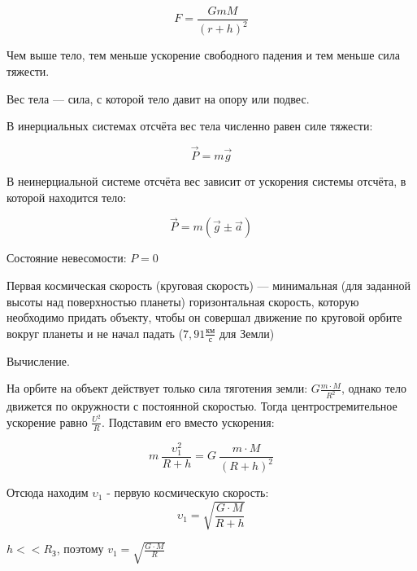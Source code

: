 $$F=\frac{GmM}{(r+h)^2}$$

Чем выше тело, тем меньше ускорение свободного падения и тем меньше сила тяжести.

\begin{definition}
    Вес тела — сила, с которой тело давит на опору или подвес.

    В инерциальных системах отсчёта вес тела численно равен силе тяжести:

    $$\vec P=m\vec g$$

    В неинерциальной системе отсчёта вес зависит от ускорения системы отсчёта, в которой находится тело:

    $$
    \vec P=m(\vec g\pm\vec a)
    $$

    Состояние невесомости: $P=0$
\end{definition}

\begin{definition}
    Первая космическая скорость (круговая скорость) — минимальная (для заданной высоты над поверхностью планеты) горизонтальная скорость, 
    которую необходимо придать объекту, чтобы он совершал движение по круговой орбите вокруг планеты и не начал падать ($7,91\frac{км}{с}$ для Земли)
\end{definition}

\begin{remark}
    Вычисление.

    На орбите на объект действует только сила тяготения земли: $G \frac{m\cdot M}{R^2}$, 
    однако тело движется по окружности с постоянной скоростью. Тогда центростремительное ускорение равно $\frac{U^2}{R}$. 
    Подставим его вместо ускорения:

    $$m\ \frac{\upsilon^2_1}{R+h}=G\ \frac{m\cdot M}{(R+h)^2}$$

    Отсюда находим $\upsilon_1$ - первую космическую скорость:
    $$\upsilon_1=\sqrt{\frac{G\cdot M}{R+h}}$$
\end{remark}

\begin{remark}
    $h << R_З$, поэтому $v_1 = \sqrt{\frac{G\cdot M}{R}}$
\end{remark}
